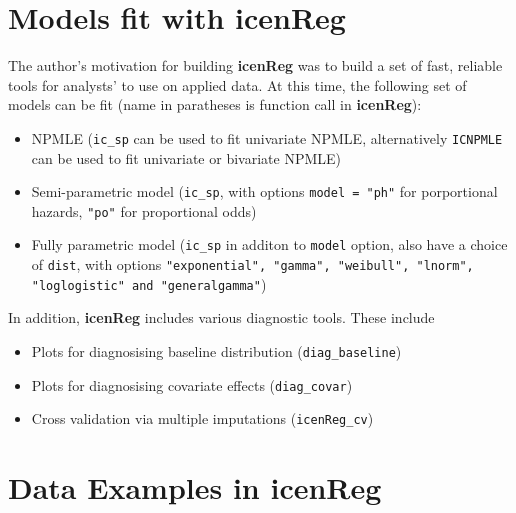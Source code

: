 \documentclass[11pt]{report}
\begin{document}
\section{Models fit with {\bf{icenReg}} }

  The author's motivation for building {\bf{icenReg}} was to build a set of fast, reliable
  tools for analysts' to use on applied data. At this time, the following set of models can 
  be fit (name in paratheses is function call in {\bf{icenReg}}):
  
  \begin{itemize}
  
    \item NPMLE (\texttt{ic\_sp} can be used to fit univariate NPMLE, alternatively \texttt{ICNPMLE} can be used to fit univariate or bivariate NPMLE)
  
    \item Semi-parametric model (\texttt{ic\_sp}, with options \texttt{model = "ph"} for 
    porportional hazards, \texttt{"po"} for proportional odds)
    
    \item Fully parametric model (\texttt{ic\_sp} in additon to \texttt{model} option, also 
    have a choice of \texttt{dist}, with options \texttt{"exponential", "gamma", "weibull", "lnorm", "loglogistic" and "generalgamma"})
  
  \end{itemize}
  
  In addition, {\bf{icenReg}} includes various diagnostic tools. These include
  
  \begin{itemize}
  
    \item Plots for diagnosising baseline distribution (\texttt{diag\_baseline})
    
    \item Plots for diagnosising covariate effects (\texttt{diag\_covar})
    
    \item Cross validation via multiple imputations (\texttt{icenReg\_cv})
  
  \end{itemize}
  
  
  \section{Data Examples in {\bf{icenReg}} }
  
\end{document}
